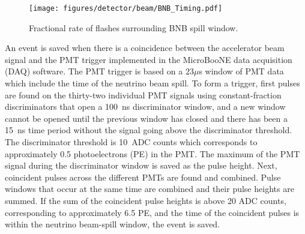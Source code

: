   \begin{figure}[h]
    \centering
    \texttt{[image: figures/detector/beam/BNB\_Timing.pdf]}
    \caption{Fractional rate of flashes surrounding BNB spill window.}
    \label{fig:bnbtiming}
  \end{figure}

  An event is saved when there is a coincidence between the accelerator beam
  signal and the PMT trigger implemented in the MicroBooNE data acquisition
  (DAQ) software. The PMT trigger is based on a $23 \mu$s window of PMT data
  which include the time of the neutrino beam spill. To form a trigger, first
  pulses are found on the thirty-two individual PMT signals using
  constant-fraction discriminators that open a 100~ns discriminator window, and
  a new window cannot be opened until the previous window has closed and there
  has been a 15~ns time period without the signal going above the discriminator
  threshold.  The discriminator threshold is 10~ADC counts which corresponds to
  approximately 0.5 photoelectrons (PE) in the PMT. The maximum of the PMT
  signal during the discriminator window is saved as the pulse height.  Next,
  coincident pulses across the different PMTs are found and combined.  Pulse
  windows that occur at the same time are combined and their pulse heights are
  summed. If the sum of the coincident pulse heights is above 20 ADC counts,
  corresponding to approximately 6.5 PE, and the time of the coincident pulses
  is within the neutrino beam-spill window, the event is saved.


